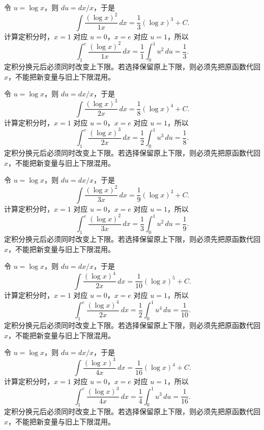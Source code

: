 \documentclass[12pt,fontset=fandol]{ctexart}
\begin{document}
\begin{solve}\label{ans:c12q19}
令 $u=\log x$，则 $du=dx/x$，于是
\[
\int\frac{(\log x)^{2}}{1x}\,dx=\frac{1}{3}(\log x)^{3}+C.
\]
计算定积分时，$x=1$ 对应 $u=0$，$x=e$ 对应 $u=1$，所以
\[
\int_1^e\frac{(\log x)^{2}}{1x}\,dx=\frac1{1}\int_0^1u^{2}\,du=\frac{1}{3}.
\]
定积分换元后必须同时改变上下限。若选择保留原上下限，则必须先把原函数代回 $x$，不能把新变量与旧上下限混用。
\end{solve}

\begin{solve}\label{ans:c12q20}
令 $u=\log x$，则 $du=dx/x$，于是
\[
\int\frac{(\log x)^{3}}{2x}\,dx=\frac{1}{8}(\log x)^{4}+C.
\]
计算定积分时，$x=1$ 对应 $u=0$，$x=e$ 对应 $u=1$，所以
\[
\int_1^e\frac{(\log x)^{3}}{2x}\,dx=\frac1{2}\int_0^1u^{3}\,du=\frac{1}{8}.
\]
定积分换元后必须同时改变上下限。若选择保留原上下限，则必须先把原函数代回 $x$，不能把新变量与旧上下限混用。
\end{solve}

\begin{solve}\label{ans:c12q21}
令 $u=\log x$，则 $du=dx/x$，于是
\[
\int\frac{(\log x)^{2}}{3x}\,dx=\frac{1}{9}(\log x)^{3}+C.
\]
计算定积分时，$x=1$ 对应 $u=0$，$x=e$ 对应 $u=1$，所以
\[
\int_1^e\frac{(\log x)^{2}}{3x}\,dx=\frac1{3}\int_0^1u^{2}\,du=\frac{1}{9}.
\]
定积分换元后必须同时改变上下限。若选择保留原上下限，则必须先把原函数代回 $x$，不能把新变量与旧上下限混用。
\end{solve}

\begin{solve}\label{ans:c12q22}
令 $u=\log x$，则 $du=dx/x$，于是
\[
\int\frac{(\log x)^{4}}{2x}\,dx=\frac{1}{10}(\log x)^{5}+C.
\]
计算定积分时，$x=1$ 对应 $u=0$，$x=e$ 对应 $u=1$，所以
\[
\int_1^e\frac{(\log x)^{4}}{2x}\,dx=\frac1{2}\int_0^1u^{4}\,du=\frac{1}{10}.
\]
定积分换元后必须同时改变上下限。若选择保留原上下限，则必须先把原函数代回 $x$，不能把新变量与旧上下限混用。
\end{solve}

\begin{solve}\label{ans:c12q23}
令 $u=\log x$，则 $du=dx/x$，于是
\[
\int\frac{(\log x)^{3}}{4x}\,dx=\frac{1}{16}(\log x)^{4}+C.
\]
计算定积分时，$x=1$ 对应 $u=0$，$x=e$ 对应 $u=1$，所以
\[
\int_1^e\frac{(\log x)^{3}}{4x}\,dx=\frac1{4}\int_0^1u^{3}\,du=\frac{1}{16}.
\]
定积分换元后必须同时改变上下限。若选择保留原上下限，则必须先把原函数代回 $x$，不能把新变量与旧上下限混用。
\end{solve}
\end{document}
